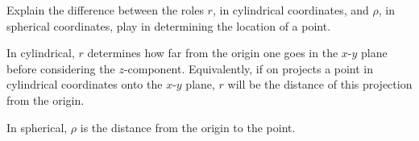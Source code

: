 {Explain the difference between the roles $r$, in cylindrical coordinates, and $\rho$, in spherical coordinates, play in determining the location of a point.
}
{In cylindrical, $r$ determines how far from the origin one goes in the $x$-$y$ plane before considering the $z$-component. Equivalently, if on projects a point in cylindrical coordinates onto the $x$-$y$ plane, $r$ will be the distance of this projection from the origin.

In spherical, $\rho$ is the distance from the origin to the point. 
}
